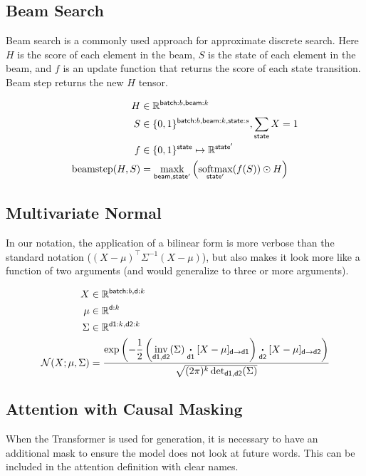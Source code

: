 \documentclass{article}
\newcommand{\name}[1]{\mathsf{#1}}
\newcommand{\ndot}[1]{\mathbin{\mathop{\thinspace\boldsymbol\cdot\thinspace}\displaylimits_{\name{#1}}}}
\newcommand{\nsum}[1]{\mathop{\sum}_{\name{#1}}}
\newcommand{\nfun}[2]{\mathop{\text{#2}}\displaylimits_{\name{#1}}}
\newcommand{\reals}{\mathbb{R}}
\begin{document}
\subsection{Beam Search}

Beam search is a commonly used approach for approximate discrete search. Here $H$ is the score of each element in the beam, $S$ is the state of each element in the beam, and $f$ is an update function that returns the score of each state transition. 
Beam step returns the new $H$ tensor. 

\begin{align*} 
H &\in \reals^{{ \name{batch}:b, \name{beam}:k}} \\
S &\in \{0, 1\}^{{ \name{batch}:b, \name{beam}:k, \name{state}:s}}, \nsum{state} X = 1\\
f &\in \{0, 1\}^{{\name{state}}} \mapsto \reals^{{\name{state'}}} \\ 
\text{beamstep}(H, S) &=  \nfun{beam, state'}{maxk} \left( \nfun{state'}{softmax}(f(S)) \odot H  \right)
\end{align*} 

\subsection{Multivariate Normal}

In our notation, the application of a bilinear form is more verbose than the standard notation ($(X-\mu)^\top \Sigma^{-1} (X-\mu)$), but also makes it look more like a function of two arguments (and would generalize to three or more arguments).

\begin{align*} 
X &\in \reals^{\name{batch}:b, \name{d}:k}  \\
\mu &\in \reals^{{\name{d}:k}}  \\
\Sigma & \in \reals^{{\name{d1}:k, \name{d2}:k}}  \\
{\cal N}(X; \mu, \Sigma) &= \frac{\displaystyle \exp\left(-\frac{1}{2}  \left(\nfun{d1, d2}{inv}(\Sigma) \ndot{d1} [X - \mu]_{\name{d} \rightarrow \name{d1}} \right) \ndot{d2} [X - \mu]_{\name{d} \rightarrow \name{d2}} \right) }{\sqrt{(2 \pi)^k \nfun{d1, d2}{det}(\Sigma)} }
\end{align*}


\subsection{Attention with Causal Masking}

When the Transformer is used for generation, it is necessary to have
an additional mask to ensure the model does not look at future words.
This can be included in the attention definition with clear names.
\end{document}
